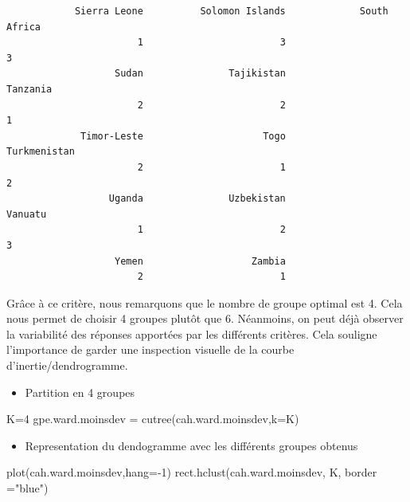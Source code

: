 \documentclass[
]{article}
\newenvironment{Shaded}{}{}
\newcommand{\AttributeTok}[1]{#1}
\newcommand{\DecValTok}[1]{#1}
\newcommand{\FunctionTok}[1]{#1}
\newcommand{\NormalTok}[1]{#1}
\newcommand{\OtherTok}[1]{\textcolor[rgb]{1.00,0.25,0.00}{#1}}
\newcommand{\SpecialCharTok}[1]{\textcolor[rgb]{0.00,0.50,0.50}{#1}}
\newcommand{\StringTok}[1]{\textcolor[rgb]{0.00,0.50,0.50}{#1}}
\providecommand{\tightlist}{%
  \setlength{\itemsep}{0pt}\setlength{\parskip}{0pt}}
\begin{document}
\begin{verbatim}
            Sierra Leone          Solomon Islands             South Africa 
                       1                        3                        3 
                   Sudan               Tajikistan                 Tanzania 
                       2                        2                        1 
             Timor-Leste                     Togo             Turkmenistan 
                       2                        1                        2 
                  Uganda               Uzbekistan                  Vanuatu 
                       1                        2                        3 
                   Yemen                   Zambia 
                       2                        1 
\end{verbatim}

Grâce à ce critère, nous remarquons que le nombre de groupe optimal est
4. Cela nous permet de choisir 4 groupes plutôt que 6. Néanmoins, on
peut déjà observer la variabilité des réponses apportées par les
différents critères. Cela souligne l'importance de garder une inspection
visuelle de la courbe d'inertie/dendrogramme.

\begin{itemize}
\tightlist
\item
  Partition en 4 groupes
\end{itemize}

\begin{Shaded}
\begin{Highlighting}[]
\NormalTok{K}\OtherTok{=}\DecValTok{4}
\NormalTok{gpe.ward.moinsdev }\OtherTok{=} \FunctionTok{cutree}\NormalTok{(cah.ward.moinsdev,}\AttributeTok{k=}\NormalTok{K)}
\end{Highlighting}
\end{Shaded}

\begin{itemize}
\tightlist
\item
  Representation du dendogramme avec les différents groupes obtenus
\end{itemize}

\begin{Shaded}
\begin{Highlighting}[]
\FunctionTok{plot}\NormalTok{(cah.ward.moinsdev,}\AttributeTok{hang=}\SpecialCharTok{{-}}\DecValTok{1}\NormalTok{)}
\FunctionTok{rect.hclust}\NormalTok{(cah.ward.moinsdev, K, }\AttributeTok{border =}\StringTok{"blue"}\NormalTok{)}
\end{Highlighting}
\end{Shaded}
\end{document}

